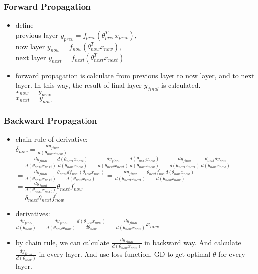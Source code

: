 \begin{frame}
\frametitle{Forward Propagation}
	\small
	\begin{itemize}
		\item define 
			\\\hspace{1cm}previous layer $y_{prev}=f_{prev}(\theta_{prev}^Tx_{prev})$,
			\\\hspace{1cm}now layer $y_{now}=f_{now}(\theta_{now}^Tx_{now})$,
			\\\hspace{1cm}next layer $y_{next}=f_{next}(\theta_{next}^Tx_{next})$
		\item forward propagation is calculate from previous layer to now layer, and to next layer. In this way, the result of final layer $y_{final}$ is calculated.
			\\\hspace{1cm}$x_{now}=y_{prev}$
			\\\hspace{1cm}$x_{next}=y_{now}$
	\end{itemize}
\end{frame}
\begin{frame}
\frametitle{Backward Propagation}
	\small
	\begin{itemize}
		\item chain rule of derivative:
			\\$\delta_{now}=\frac{dy_{final}}{d(\theta_{now}x_{now})}$
			\\	$=\frac{dy_{final}}{d(\theta_{next}x_{next})}\frac{d(\theta_{next}x_{next})}{d(\theta_{now}x_{now})}
				=\frac{dy_{final}}{d(\theta_{next}x_{next})}\frac{d(\theta_{next}y_{now})}{d(\theta_{now}x_{now})}
				=\frac{dy_{final}}{d(\theta_{next}x_{next})}\frac{\theta_{next}dy_{now}}{d(\theta_{now}x_{now})}$
			\\$	=\frac{dy_{final}}{d(\theta_{next}x_{next})}\frac{\theta_{next}df_{now}(\theta_{now}x_{now})}{d(\theta_{now}x_{now})}
				=\frac{dy_{final}}{d(\theta_{next}x_{next})}\frac{\theta_{next}f^\prime_{now}d(\theta_{now}x_{now})}{d(\theta_{now}x_{now})}$
			\\$ =\frac{dy_{final}}{d(\theta_{next}x_{next})}\theta_{next}f^\prime_{now}$
			\\$=\delta_{next}\theta_{next}f^\prime_{now}$
		\item derivatives:
			\\$\frac{dy_{final}}{d(\theta_{now})}
				=\frac{dy_{final}}{d(\theta_{now}x_{now})}\frac{d(\theta_{now}x_{now})}{d\theta_{now}}
				=\frac{dy_{final}}{d(\theta_{now}x_{now})}x_{now}$
		\item by chain rule, we can calculate $\frac{dy_{final}}{d(\theta_{now}x_{now})}$ in backward way. And calculate $\frac{dy_{final}}{d(\theta_{now})}$ in every layer. And use loss function, GD to get optimal $\theta$ for every layer.
	\end{itemize}
\end{frame}
